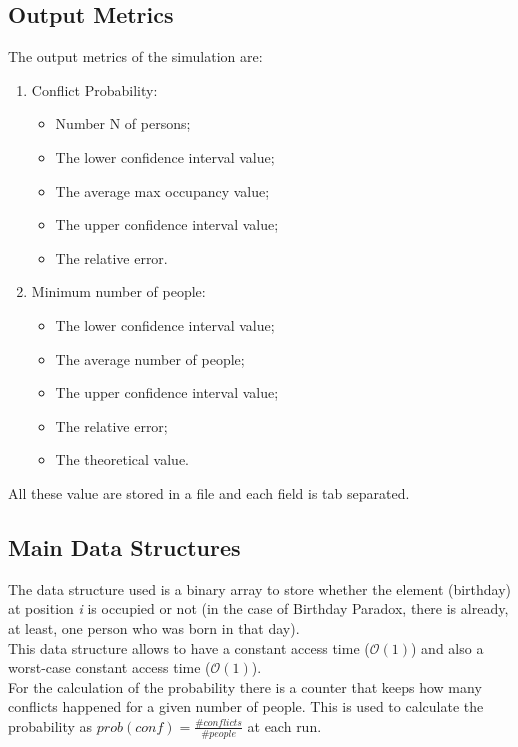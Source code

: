 \documentclass[twocolumn,letterpaper]{report}
\begin{document}
{	\subsection{Output Metrics}
			The output metrics of the simulation are:
			\begin{enumerate}
					\item Conflict Probability:
					\begin{itemize}
							\item Number N of persons;
							\item The lower confidence interval value;
							\item The average max occupancy value;
							\item The upper confidence interval value;
							\item The relative error.
					\end{itemize}
					\item Minimum number of people:
					\begin{itemize}
							\item The lower confidence interval value;
							\item The average number of people;
							\item The upper confidence interval value;
							\item The relative error;
							\item The theoretical value.
					\end{itemize}
			\end{enumerate}
			All these value are stored in a file and each field is tab separated.
	
	\subsection{Main Data Structures}
				The data structure used is a binary array to store whether the element (birthday) at position \emph{i} is occupied or not (in the case of Birthday Paradox, there is already, at least, one person who was born in that day). \\ This data structure allows to have a constant access time ($\mathcal{O}(1)$) and also a worst-case constant access time ($\mathcal{O}(1)$). \\
				For the calculation of the probability there is a counter that keeps how many conflicts happened for a given number of people. This is used to calculate the probability as $prob(conf)=\frac{\#conflicts}{\#people}$ at each run. \\
			
}
\end{document}
